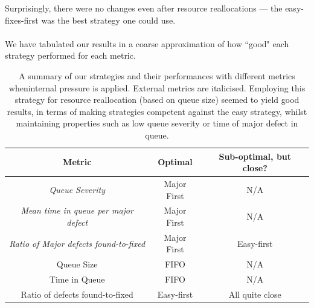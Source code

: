 Surprisingly, there were no changes even after resource reallocations --- the easy-fixes-first was
the best strategy one could use.\\
\\
We have tabulated our results in a coarse approximation of how ``good" each strategy performed for
each metric.

\begin{table}[ht!]
	\centering
	\begin{tabular}{|c|c|c|}
	\hline
	{\bf Metric} & {\bf Optimal} & {\bf Sub-optimal, but close?} \\ \hline
	{\em Queue Severity} & Major First & N/A \\ \hline
	{\em Mean time in queue per major defect} & Major First & N/A\\ \hline
	{\em Ratio of Major defects found-to-fixed} & Major First & Easy-first \\ \hline
	Queue Size & FIFO & N/A \\ \hline
	Time in Queue & FIFO & N/A \\ \hline
	Ratio of defects found-to-fixed & Easy-first & All quite close \\ \hline
	\end{tabular}
	\caption{A summary of our strategies and their performances with different
    metrics wheninternal 
pressure is applied.
External metrics are italicised.
Employing this strategy for resource reallocation (based on queue size) seemed to yield good results, in terms of making
strategies competent against the easy strategy, whilst maintaining properties such as low queue
severity or time of major defect in queue.}
	\label{summaryin}
\end{table}

